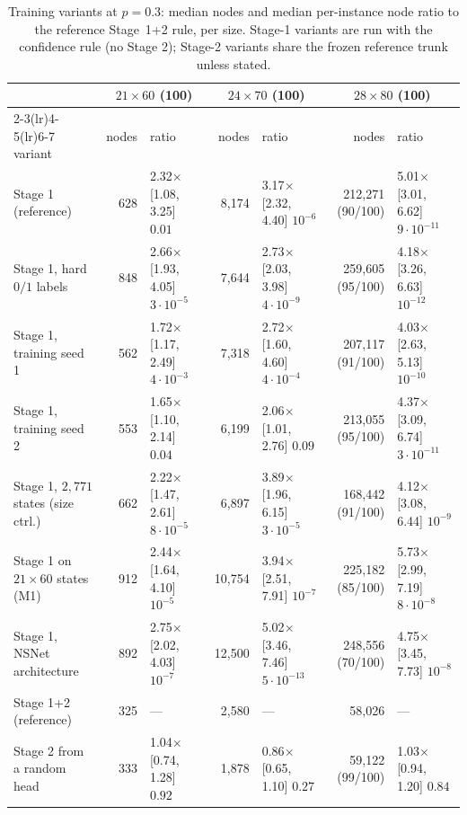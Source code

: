 \begin{table}[t]
\centering
\caption{Training variants at $p=0.3$: median nodes and median per-instance node ratio to the reference Stage~1+2 rule, per size. Stage-1 variants are run with the confidence rule (no Stage 2); Stage-2 variants share the frozen reference trunk unless stated.}
\label{tab:variants}
\scriptsize
\begin{tabular}{lrlrlrl}
\toprule
 & \multicolumn{2}{c}{$21\times60$ (100)} & \multicolumn{2}{c}{$24\times70$ (100)} & \multicolumn{2}{c}{$28\times80$ (100)} \\
\cmidrule(lr){2-3}\cmidrule(lr){4-5}\cmidrule(lr){6-7}
variant & nodes & ratio & nodes & ratio & nodes & ratio \\
\midrule
Stage 1 (reference) & 628 & 2.32$\times$ [1.08, 3.25] $0.01$ & 8,174 & 3.17$\times$ [2.32, 4.40] $10^{-6}$ & 212,271 (90/100) & 5.01$\times$ [3.01, 6.62] $9\cdot10^{-11}$ \\
Stage 1, hard $0/1$ labels & 848 & 2.66$\times$ [1.93, 4.05] $3\cdot10^{-5}$ & 7,644 & 2.73$\times$ [2.03, 3.98] $4\cdot10^{-9}$ & 259,605 (95/100) & 4.18$\times$ [3.26, 6.63] $10^{-12}$ \\
Stage 1, training seed 1 & 562 & 1.72$\times$ [1.17, 2.49] $4\cdot10^{-3}$ & 7,318 & 2.72$\times$ [1.60, 4.60] $4\cdot10^{-4}$ & 207,117 (91/100) & 4.03$\times$ [2.63, 5.13] $10^{-10}$ \\
Stage 1, training seed 2 & 553 & 1.65$\times$ [1.10, 2.14] $0.04$ & 6,199 & 2.06$\times$ [1.01, 2.76] $0.09$ & 213,055 (95/100) & 4.37$\times$ [3.09, 6.74] $3\cdot10^{-11}$ \\
Stage 1, $2{,}771$ states (size ctrl.) & 662 & 2.22$\times$ [1.47, 2.61] $8\cdot10^{-5}$ & 6,897 & 3.89$\times$ [1.96, 6.15] $3\cdot10^{-5}$ & 168,442 (91/100) & 4.12$\times$ [3.08, 6.44] $10^{-9}$ \\
Stage 1 on $21\times60$ states (M1) & 912 & 2.44$\times$ [1.64, 4.10] $10^{-5}$ & 10,754 & 3.94$\times$ [2.51, 7.91] $10^{-7}$ & 225,182 (85/100) & 5.73$\times$ [2.99, 7.19] $8\cdot10^{-8}$ \\
Stage 1, NSNet architecture & 892 & 2.75$\times$ [2.02, 4.03] $10^{-7}$ & 12,500 & 5.02$\times$ [3.46, 7.46] $5\cdot10^{-13}$ & 248,556 (70/100) & 4.75$\times$ [3.45, 7.73] $10^{-8}$ \\
\midrule
Stage 1+2 (reference) & 325 & --- & 2,580 & --- & 58,026 & --- \\
Stage 2 from a random head & 333 & 1.04$\times$ [0.74, 1.28] $0.92$ & 1,878 & 0.86$\times$ [0.65, 1.10] $0.27$ & 59,122 (99/100) & 1.03$\times$ [0.94, 1.20] $0.84$ \\

\end{tabular}
\end{table}
